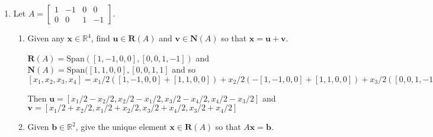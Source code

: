 \documentclass[letterpaper]{article}
\newcommand{\Span}{\text{Span}}
\begin{document}
\begin{enumerate}
\begin{enumerate}
  \item
  The column space and the nullspace both have basis $\left[\begin{array}{r}1\\0\end{array}\right]$.

  $\left[\begin{array}{rr}0&1\\0&0\end{array}\right]$
  \item
  The column space and the nullspace both have basis
  $\left[\begin{array}{r}1\\0\\0\end{array}\right]$.
  
  The column space basis has the same cardinality as the row space basis. The cardinality of the nullspace basis and the rowspace basis should add up to three. But it adds up to two, and so we can't make a matrix.

  \end{enumerate}
\setcounter{enumi}{10}
\item
Let $A=\left[\begin{array}{rrrr}1&-1&0&0\\0&0&1&-1\end{array}\right]$.
  \begin{enumerate}
  \item
  Given any $\mathbf{x}\in \mathbb{R}^4$, find $\mathbf{u}\in \mathbf{R}(A)$ and $\mathbf{v}\in \mathbf{N}(A)$ so that $\mathbf{x}=\mathbf{u}+\mathbf{v}$.

  $\mathbf{R}(A)=\Span([1,-1,0,0],[0,0,1,-1])$ and $\mathbf{N}(A)=\Span([1,1,0,0],[0,0,1,1]$ and so $[x_1,x_2,x_3,x_4]=x_1/2([1,-1,0,0]+[1,1,0,0])+x_2/2(-[1,-1,0,0]+[1,1,0,0])+x_3/2([0,0,1,-1]+[0,0,1,1])+x_4/2(-[0,0,1,-1]+[0,0,1,1])$

  Then $\mathbf{u}=[x_1/2-x_2/2,x_2/2-x_1/2,x_3/2-x_4/2,x_4/2-x_3/2]$ and $\mathbf{v}=[x_1/2+x_2/2,x_1/2+x_2/2,x_3/2+x_4/2,x_3/2+x_4/2]$
  \item
  Given $\mathbf{b}\in \mathbb{R}^2$, give the unique element $\mathbf{x}\in \mathbf{R}(A)$ so that $A\mathbf{x}=\mathbf{b}$.


\end{enumerate}
\end{enumerate}
\end{document}
